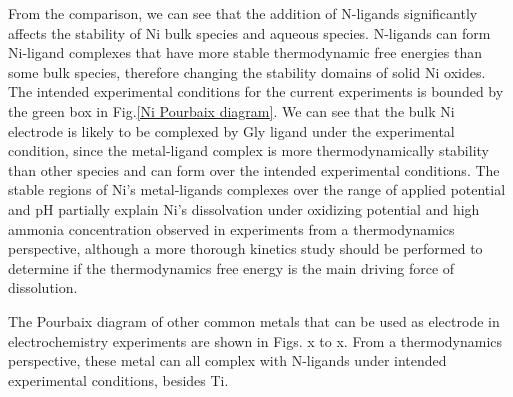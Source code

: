 \documentclass[journal=jacsat,manuscript=article]{achemso}
\begin{document}
From the comparison, we can see that the addition of N-ligands significantly affects the stability of Ni bulk species and aqueous species. N-ligands can form Ni-ligand complexes that have more stable thermodynamic free energies than some bulk species, therefore changing the stability domains of solid Ni oxides. The intended experimental conditions for the current experiments is bounded by the green box in Fig.\ref{Ni Pourbaix diagram}. We can see that the bulk Ni electrode is likely to be complexed by Gly ligand under the experimental condition, since the metal-ligand complex is more thermodynamically stability than other species and can form over the intended experimental conditions. The stable regions of Ni's metal-ligands complexes over the range of applied potential and pH partially explain Ni's dissolvation under oxidizing potential and high ammonia concentration observed in experiments from a thermodynamics perspective, although a more thorough kinetics study should be performed to determine if the thermodynamics free energy is the main driving force of dissolution. 

The Pourbaix diagram of other common metals that can be used as electrode in electrochemistry experiments are shown in Figs. x to x. From a thermodynamics perspective, these metal can all complex with N-ligands under intended experimental conditions, besides Ti. 
\end{document}
